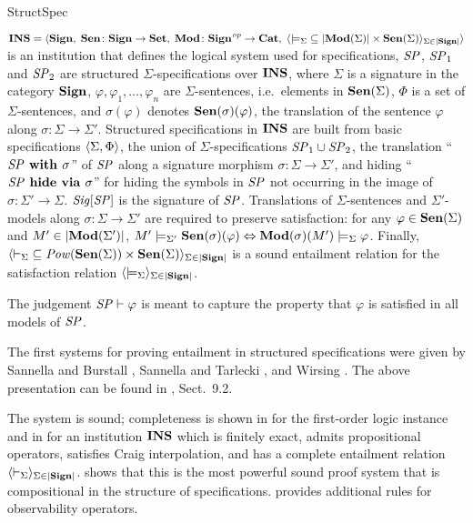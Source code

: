 \begin{entry}{StructSpec}
 \begin{clarifications}
${\bf INS} = \langle{{\bf Sign},\; {\bf Sen}\colon{\bf Sign}\to{\bf Set},\; {\bf Mod}\colon{\bf Sign}^{\mathit{op}}\to{\bf Cat},\;
      \langle{{\models_\Sigma}\subseteq|{\bf Mod}(\Sigma)|\times{\bf Sen}(\Sigma)}\rangle_{\Sigma\in|{\bf Sign}|}}\rangle$
is an institution that defines the logical system used for specifications,
$\mathit{SP}$, $\mathit{SP}_1$ and $\mathit{SP}_2$ are structured $\Sigma$-specifications over ${\bf INS}$,
where $\Sigma$ is a signature in the category ${\bf Sign}$,
$\varphi, \varphi_1, \ldots, \varphi_n$ are $\Sigma$-sentences,
i.e.\ elements in ${\bf Sen}(\Sigma)$,
$\Phi$ is a set of $\Sigma$-sentences, and
$\sigma(\varphi)$ denotes ${\bf Sen}(\sigma)(\varphi)$, the translation of the sentence $\varphi$ along $\sigma\colon\Sigma\to\Sigma'$.
Structured specifications in ${\bf INS}$ are built from basic specifications
$\langle{\Sigma, \Phi}\rangle$,
the union of $\Sigma$-specifications $\mathit{SP}_1 \cup \mathit{SP}_2$,
the translation ``$\mathit{SP}\textbf{\upshape{} with }\sigma$'' of $\mathit{SP}$
    along a signature morphism $\sigma\colon\Sigma\to\Sigma'$,
and hiding ``$\mathit{SP}\textbf{\upshape{} hide via }\sigma$'' for hiding the symbols in $\mathit{SP}$
    not occurring in the image of $\sigma\colon\Sigma'\to\Sigma$.
$\mathit{Sig}[\mathit{SP}]$ is the signature of $\mathit{SP}$.
Translations of $\Sigma$-sentences and $\Sigma'$-models
along $\sigma \colon \Sigma \rightarrow \Sigma'$
are required to preserve satisfaction:
for any $\varphi \in {\bf Sen}(\Sigma)$ and $M' \in |{\bf Mod}(\Sigma')|$,
$M' \models_{\Sigma'} {\bf Sen}(\sigma)(\varphi)
     \Leftrightarrow
  {\bf Mod}(\sigma)(M') \models_{\Sigma} \varphi$.
Finally, $\langle{{\vdash_\Sigma}\subseteq{\mathit{Pow}}({\bf Sen}(\Sigma))\times{\bf Sen}(\Sigma)}\rangle_{\Sigma\in|{\bf Sign}|}$
is a sound entailment relation
for the satisfaction relation $\langle{{\models_\Sigma}}\rangle_{\Sigma\in|{\bf Sign}|}$.

The judgement $\mathit{SP} \vdash \varphi$ is meant to capture the property that $\varphi$ is satisfied
in all models of $\mathit{SP}$.
\end{clarifications}

\begin{history}
The first systems for proving entailment in structured specifications were
given by Sannella and Burstall \cite{SB83}, Sannella and Tarlecki \cite{ST88},
and Wirsing \cite{Wir91}.
The above presentation can be found in \cite{ST12}, Sect.~9.2.
\end{history}

 \begin{technicalities}
The system is sound; completeness is shown in \cite{Wir91} for the first-order logic instance and in \cite{Bor02,ST12}
for an institution ${\bf INS}$ which is finitely exact, admits propositional operators, satisfies Craig interpolation,
and has a complete entailment relation $\langle{{\vdash_\Sigma}}\rangle_{\Sigma\in|{\bf Sign}|}$.
\cite{ST14} shows that this is the most powerful sound proof system that is compositional in the structure of specifications.
 \cite{RH97} provides additional rules for observability operators.


\end{technicalities}
\end{entry}
